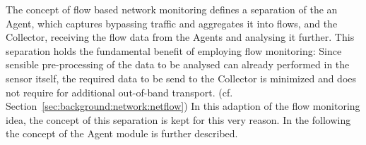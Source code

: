 The concept of flow based network monitoring defines a separation of the an Agent, which captures bypassing traffic and aggregates it into flows, and the Collector, receiving the flow data from the Agents and analysing it further.
This separation holds the fundamental benefit of employing flow monitoring: Since sensible pre-processing of the data to be analysed can already performed in the sensor itself, the required data to be send to the Collector is minimized and does not require for additional out-of-band transport. (cf. Section~\ref{sec:background:network:netflow})
In this adaption of the flow monitoring idea, the concept of this separation is kept for this very reason. In the following the concept of the Agent module is further described.

